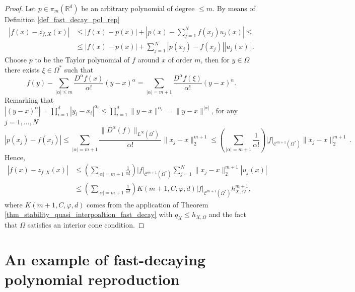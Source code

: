 \documentclass{drna}
\begin{document}
\begin{proof}
Let $p \in \pi_{m}(\mathbb{R}^d)$ be an arbitrary polynomial of degree $\le m$. By means of Definition \ref{def_fast_decay_pol_rep} 
\begin{equation*}
	\begin{split}
		|f(x)-z_{f,X}(x)| & \leq |f(x)-p(x)|+\left| p(x)-\sum_{j=1}^N f(x_j)u_j(x)\right| \leq \\
		& \leq |f(x)-p(x)| + \sum_{j=1}^N |p(x_j)-f(x_j)||u_j(x)|\,.
  \end{split}
\end{equation*}
Choose $p$ to be the Taylor polynomial of $f$ around $x$ of order $m$, then for $y \in \Omega$ there exists $\xi \in \Omega^{*}$ such that
\begin{equation*}
	f(y)-\sum_{|\alpha| \leq m} \frac{D^{\alpha}f(x)}{\alpha!}(y-x)^{\alpha} = \sum_{|\alpha|= m+1} \frac{D^{\alpha}f(\xi)}{\alpha!}(y-x)^{\alpha}.
\end{equation*}
Remarking that $|(y-x)^\alpha| = \prod_{i=1}^{d}|y_i-x_i|^{\alpha_i} \leq \prod_{i=1}^{d}\|y-x\|^{\alpha_i} = \|y-x\|^{|\alpha|}$, for any $j=1,\dots,N$
\begin{equation*}
    |p(x_j)-f(x_j)| \leq \sum_{|\alpha|=m+1}\frac{\|D^{\alpha}(f)\|_{L^{\infty}(\Omega^*)}}{\alpha!}\|x_j-x\|_2^{m+1} \leq \left( \sum_{|\alpha|=m+1}\frac{1}{\alpha!} \right)|f|_{\mathcal{C}^{m+1}(\Omega^*)}\|x_j-x\|_2^{m+1}\,.
\end{equation*}
Hence,
\begin{equation*}
\begin{split}
    |f(x)-z_{f,X}(x)| & \leq \left( \sum_{|\alpha|=m+1}\frac{1}{\alpha!} \right)|f|_{\mathcal{C}^{m+1}(\Omega^*)} \sum_{j=1}^{N} \|x_j-x\|_2^{m+1} |u_{j}(x)| \\ 
    & \leq \left( \sum_{|\alpha|=m+1}\frac{1}{\alpha!} \right) K(m+1,C,\varphi,d) |f|_{\mathcal{C}^{m+1}(\Omega^*)} h_{X,\Omega}^{m+1},
\end{split}
\end{equation*}
where $K(m+1,C,\varphi,d)$ comes from the application of Theorem \ref{thm_stability_quasi_interpoaltion_fast_decay} with $q_X \leq h_{X,\Omega}$ and the fact that $\Omega$ satisfies an interior cone condition.
\end{proof}

\section{An example of fast-decaying polynomial reproduction}
\label{section_ex_c_infinity_fast}
\end{document}
